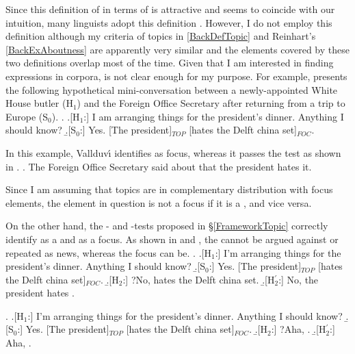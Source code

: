 Since this definition of  in terms of  is attractive and seems to coincide with our intuition,
many linguists adopt this definition \cite[e.g.,][]{lambrecht94,erteschik-shir07}.
However, I do not employ this definition
although my criteria of topics in \ref{BackDefTopic} and Reinhart's \ref{BackExAboutness} are apparently very similar and
the elements covered by these two definitions overlap most of the time.
Given that I am interested in finding  expressions in corpora,
 is not clear enough for my purpose.
For example,  presents the following hypothetical mini-conversation between a newly-appointed White House butler (H$_{1}$) and the Foreign Office Secretary after returning from a trip to Europe (S$_{0}$).
%
\ex. \a.[H$_{1}$:] I am arranging things for the president's dinner. Anything I should know?
     \b.[S$_{0}$:] Yes. [The president]$_{TOP}$ [hates the Delft china set]$_{FOC}$.\\
     \begin{flushright}
     {\cite[9, 12]{vallduvi94}}
     \end{flushright}

In this example, Vallduv\'{\i} identifies  as focus,
whereas it passes the  test as shown in \Next.
%
\ex. The Foreign Office Secretary said about  that the president hates it.

Since I am assuming that topics are in complementary distribution with focus elements,
the element in question is not a focus if it is a , and vice versa.

On the other hand, the - and -tests proposed in \S \ref{FrameworkTopic} correctly identify  as a  and  as a focus.
As shown in \Next[H$_{2}$] and \NNext[H$_{2}$],
the   cannot be argued against or repeated as news,
whereas the focus  can be.
%
\ex. \a.[H$_{1}$:] I'm arranging things for the president's dinner. Anything I should know?
     \b.[S$_{0}$:] Yes. [The president]$_{TOP}$ [hates the Delft china set]$_{FOC}$.
     \b.[H$_{2}$:] ?No,  hates the Delft china set.
     \b.[H$_{2}^{\prime}$:] No, the president hates .

\ex. \a.[H$_{1}$:] I'm arranging things for the president's dinner. Anything I should know?
     \b.[S$_{0}$:] Yes. [The president]$_{TOP}$ [hates the Delft china set]$_{FOC}$.
     \b.[H$_{2}$:] ?Aha, .
     \b.[H$_{2}^{\prime}$:] Aha, .



